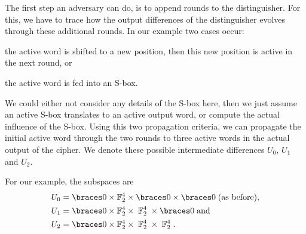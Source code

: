 \begin{figure}[t]
\begin{sidecaption}
    \end{sidecaption}
\end{figure}

The first step an adversary can do, is to append rounds to the distinguisher.
For this, we have to trace how the output differences of the distinguisher evolves through these additional rounds.
In our example two cases occur: \begin{inparaenum}
\item the active word is shifted to a new position, then this new position is active in the next round, or
\item the active word is fed into an S-box.
\end{inparaenum}
We could either not consider any details of the S-box here, then we just assume an active S-box translates to an active output word, or compute the actual influence of the S-box.
Using this two propagation criteria, we can propagate the initial active word through the two rounds to three active words in the actual output of the cipher.
We denote these possible intermediate differences $U_0$, $U_1$ and $U_2$.

For our example, the subspaces are
\begin{align*}
    U_0 &= \set{0} \times \F_2^4 \times \set{0} \times \set{0}\;\text{(as before)},\\
    U_1 &= \set{0} \times \F_2^4 \times \;\F_2^4\; \times \set{0}\;\text{and}\\
    U_2 &= \set{0} \times \F_2^4 \times \;\F_2^4\; \times \;\F_2^4\;.
\end{align*}

